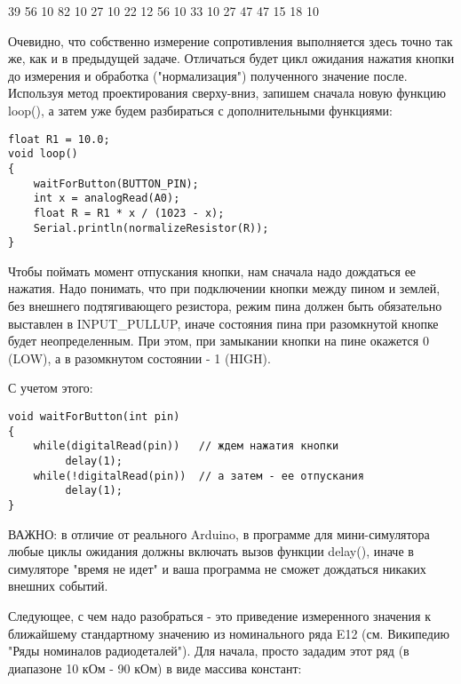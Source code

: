 \begin{myverbbox}[\small]{\voutput}
    39
    56
    10
    82
    10
    27
    10
    22
    12
    56
    10
    33
    10
    27
    47
    47
    15
    18
    10
\end{myverbbox}
\outputTable

\solutionSection

Очевидно, что собственно измерение сопротивления выполняется здесь точно так же, как и в предыдущей задаче.  Отличаться будет цикл ожидания нажатия кнопки до измерения и обработка ("нормализация") полученного значение после.  Используя метод проектирования сверху-вниз,  запишем сначала новую функцию loop(), а затем уже будем разбираться с дополнительными функциями:

\begin{verbatim}
float R1 = 10.0;
void loop()
{
    waitForButton(BUTTON_PIN);
    int x = analogRead(A0);
    float R = R1 * x / (1023 - x); 
    Serial.println(normalizeResistor(R));
}
\end{verbatim}

Чтобы поймать момент отпускания кнопки, нам сначала надо дождаться ее нажатия. Надо понимать, что при подключении кнопки между пином и землей, без внешнего подтягивающего резистора, режим пина должен быть обязательно выставлен в INPUT\_PULLUP, иначе состояния пина при разомкнутой кнопке будет неопределенным. При этом, при замыкании кнопки на пине окажется 0 (LOW), а в разомкнутом состоянии - 1 (HIGH). 


С учетом этого:
\begin{verbatim}
void waitForButton(int pin)
{
	while(digitalRead(pin))   // ждем нажатия кнопки
         delay(1);
	while(!digitalRead(pin))  // а затем - ее отпускания
         delay(1);
}
\end{verbatim}

ВАЖНО: в отличие от реального Arduino, в программе для мини-симулятора любые циклы ожидания должны включать вызов функции delay(), иначе в симуляторе "время не идет" и ваша программа не сможет дождаться никаких внешних событий.  

Следующее, с чем надо разобраться - это приведение измеренного значения к ближайшему стандартному значению из номинального ряда E12 (см. Википедию "Ряды номиналов радиодеталей"). Для начала, просто зададим этот ряд (в диапазоне 10 кОм - 90 кОм) в виде массива констант:

